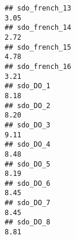 \documentclass[
]{article}
\begin{document}
\begin{verbatim}
## sdo_french_13                                                                                                                                                                                                                 3.05
## sdo_french_14                                                                                                                                                                                                                 2.72
## sdo_french_15                                                                                                                                                                                                                 4.78
## sdo_french_16                                                                                                                                                                                                                 3.21
## sdo_DO_1                                                                                                                                                                                                                      8.18
## sdo_DO_2                                                                                                                                                                                                                      8.20
## sdo_DO_3                                                                                                                                                                                                                      9.11
## sdo_DO_4                                                                                                                                                                                                                      8.48
## sdo_DO_5                                                                                                                                                                                                                      8.19
## sdo_DO_6                                                                                                                                                                                                                      8.45
## sdo_DO_7                                                                                                                                                                                                                      8.45
## sdo_DO_8                                                                                                                                                                                                                      8.81

\end{verbatim}
\end{document}
